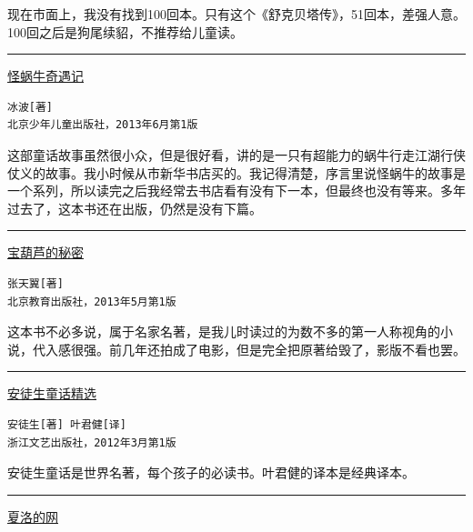 \documentclass[twoside,openright,headings=optiontohead]{ctexbook} %
\begin{document}
{现在市面上，我没有找到100回本。只有这个《舒克贝塔传》，51回本，差强人意。100回之后是狗尾续貂，不推荐给儿童读。

\begin{center}\rule{0.5\linewidth}{\linethickness}\end{center}

\href{https://www.amazon.cn/gp/product/B00DGIICJO/ref=ox_sc_act_title_5?ie=UTF8\&psc=1\&smid=A1AJ19PSB66TGU}{怪蜗牛奇遇记}

\begin{verbatim}
冰波[著]
北京少年儿童出版社，2013年6月第1版
\end{verbatim}

这部童话故事虽然很小众，但是很好看，讲的是一只有超能力的蜗牛行走江湖行侠仗义的故事。我小时候从市新华书店买的。我记得清楚，序言里说怪蜗牛的故事是一个系列，所以读完之后我经常去书店看有没有下一本，但最终也没有等来。多年过去了，这本书还在出版，仍然是没有下篇。

\begin{center}\rule{0.5\linewidth}{\linethickness}\end{center}

\href{https://www.amazon.cn/gp/product/B00DE3XZIE/ref=ox_sc_act_title_4?ie=UTF8\&psc=1\&smid=A1AJ19PSB66TGU}{宝葫芦的秘密}

\begin{verbatim}
张天翼[著]
北京教育出版社，2013年5月第1版
\end{verbatim}

这本书不必多说，属于名家名著，是我儿时读过的为数不多的第一人称视角的小说，代入感很强。前几年还拍成了电影，但是完全把原著给毁了，影版不看也罢。

\begin{center}\rule{0.5\linewidth}{\linethickness}\end{center}

\href{https://www.amazon.cn/gp/product/B00EAPSC92/ref=ox_sc_act_title_2?ie=UTF8\&psc=1\&smid=A1AJ19PSB66TGU}{安徒生童话精选}

\begin{verbatim}
安徒生[著] 叶君健[译]
浙江文艺出版社，2012年3月第1版
\end{verbatim}

安徒生童话是世界名著，每个孩子的必读书。叶君健的译本是经典译本。

\begin{center}\rule{0.5\linewidth}{\linethickness}\end{center}

\href{https://www.amazon.cn/gp/product/B00LTOJVRO/ref=ox_sc_act_title_3?ie=UTF8\&psc=1\&smid=A1AJ19PSB66TGU}{夏洛的网}

}
\end{document}
